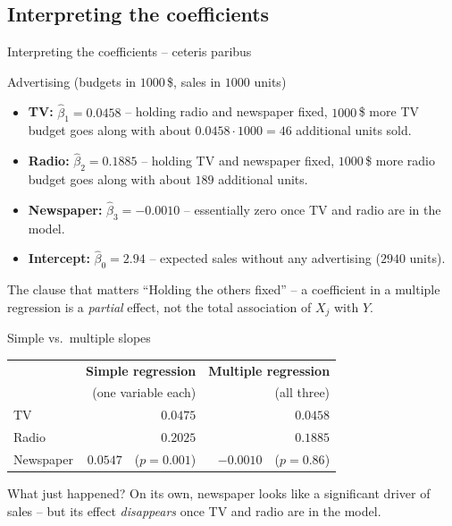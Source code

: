 \documentclass[aspectratio=169,11pt]{beamer}
\begin{document}
\subsection{Interpreting the coefficients}

\begin{frame}{Interpreting the coefficients -- ceteris paribus}
  \begin{exampleblock}{Advertising (budgets in $1000$\,\$, sales in $1000$ units)}
    \begin{itemize}\setlength{\itemsep}{4pt}
      \item \textbf{TV:} $\hat\beta_1=0.0458$ -- holding radio and newspaper
            fixed, $1000$\,\$ more TV budget goes along with about
            $0.0458\cdot1000=46$ additional units sold.
      \item \textbf{Radio:} $\hat\beta_2=0.1885$ -- holding TV and
            newspaper fixed, $1000$\,\$ more radio budget goes along with
            about $189$ additional units.
      \item \textbf{Newspaper:} $\hat\beta_3=-0.0010$ -- essentially zero
            once TV and radio are in the model.
      \item \textbf{Intercept:} $\hat\beta_0=2.94$ -- expected sales without
            any advertising ($2940$ units).
    \end{itemize}
  \end{exampleblock}
  \begin{alertblock}{The clause that matters}
    ``Holding the others fixed'' -- a coefficient in a multiple regression
    is a \emph{partial} effect, not the total association of $X_j$ with $Y$.
  \end{alertblock}
\end{frame}

\begin{frame}{Simple vs.\ multiple slopes}
  \begin{center}
    \renewcommand{\arraystretch}{1.2}
    \begin{tabular}{lrr}
      \toprule
      & \textbf{Simple regression} & \textbf{Multiple regression}\\
      & (one variable each) & (all three)\\
      \midrule
      TV         & $0.0475$ & $0.0458$ \\
      Radio      & $0.2025$ & $0.1885$ \\
      Newspaper  & $0.0547$\ \ ($p=0.001$) & $-0.0010$\ \ ($p=0.86$) \\
      \bottomrule
    \end{tabular}
  \end{center}
  \begin{alertblock}{What just happened?}
    On its own, newspaper looks like a significant driver of sales -- but its
    effect \emph{disappears} once TV and radio are in the model.
  \end{alertblock}
\end{frame}
\end{document}
